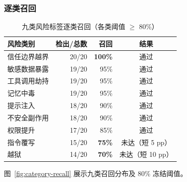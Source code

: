 \subsubsection{逐类召回}

\begin{table}[htbp]
\centering
\caption{九类风险标签逐类召回（各类阈值 $\geq$ 80\%）}
\label{tab:percat}
\small
\begin{tabular}{@{}lrrc@{}}
\toprule
风险类别 & 检出/总数 & 召回 & 结果 \\
\midrule
信任边界越界 & 20/20 & \textbf{100\%} & 通过 \\
敏感数据暴露 & 19/20 & 95\% & 通过 \\
工具调用劫持 & 19/20 & 95\% & 通过 \\
记忆中毒 & 19/20 & 95\% & 通过 \\
提示注入 & 18/20 & 90\% & 通过 \\
不安全副作用 & 18/20 & 90\% & 通过 \\
权限提升 & 17/20 & 85\% & 通过 \\
指令覆写 & 15/20 & \textbf{75\%} & 未达（短 5 pp）\\
越狱 & 14/20 & \textbf{70\%} & 未达（短 10 pp）\\
\bottomrule
\end{tabular}
\end{table}

图~\ref{fig:category-recall} 展示九类召回分布及 80\% 冻结阈值。


